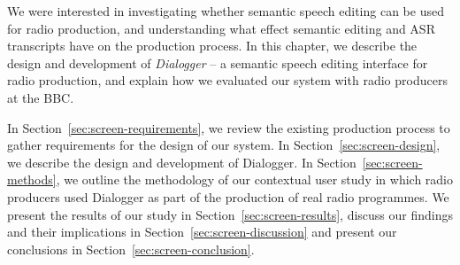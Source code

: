 

We were interested in investigating whether semantic speech editing can be used for radio production, and understanding
what effect semantic editing and ASR transcripts have on the production process.  In this chapter, we describe the
design and development of \textit{Dialogger} -- a semantic speech editing interface for radio production, and explain
how we evaluated our system with radio producers at the BBC.

In Section~\ref{sec:screen-requirements}, we review the existing production process to gather requirements for the
design of our system.  In Section~\ref{sec:screen-design}, we describe the design and development of Dialogger.  In
Section~\ref{sec:screen-methods}, we outline the methodology of our contextual user study in which radio producers used
Dialogger as part of the production of real radio programmes. We present the results of our study in
Section~\ref{sec:screen-results}, discuss our findings and their implications in Section~\ref{sec:screen-discussion}
and present our conclusions in Section~\ref{sec:screen-conclusion}.




